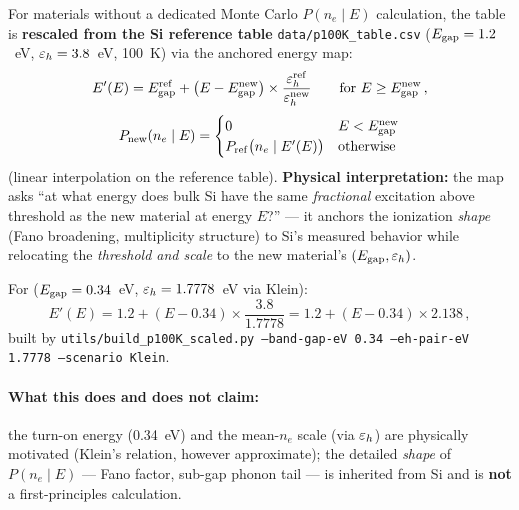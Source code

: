 For materials without a dedicated Monte Carlo $P(n_e\mid E)$ calculation,
the table is \textbf{rescaled from the Si reference table}
\texttt{data/p100K\_table.csv} ($E_\mathrm{gap}=1.2$~eV, $\varepsilon_h=3.8$~eV, 100~K) via
the anchored energy map:
\begin{equation}
E'(E) = E_\mathrm{gap}^\mathrm{ref} + \bigl(E - E_\mathrm{gap}^\mathrm{new}\bigr)\times
\frac{\varepsilon_h^\mathrm{ref}}{\varepsilon_h^\mathrm{new}} \qquad \text{for } E \geq E_\mathrm{gap}^\mathrm{new}\,,
\end{equation}
\begin{equation}
P_\mathrm{new}(n_e\mid E) = \begin{cases}
0 & E < E_\mathrm{gap}^\mathrm{new} \\
P_\mathrm{ref}\bigl(n_e \mid E'(E)\bigr) & \text{otherwise}
\end{cases}
\end{equation}
(linear interpolation on the reference table). \textbf{Physical
interpretation:} the map asks ``at what energy does bulk Si have the same
\emph{fractional} excitation above threshold as the new material at energy
$E$?'' — it anchors the ionization \emph{shape} (Fano broadening,
multiplicity structure) to Si's measured behavior while relocating the
\emph{threshold and scale} to the new material's $(E_\mathrm{gap},\varepsilon_h)$.

For \SrCdSb{} ($E_\mathrm{gap}=0.34$~eV, $\varepsilon_h=1.7778$~eV via Klein):
\begin{equation}
E'(E) = 1.2 + (E-0.34)\times\frac{3.8}{1.7778} = 1.2 + (E-0.34)\times2.138\,,
\end{equation}
built by \texttt{utils/build\_p100K\_scaled.py --band-gap-eV 0.34
--eh-pair-eV 1.7778 --scenario Klein}.

\paragraph{What this does and does not claim:} the turn-on energy
(0.34~eV) and the mean-$n_e$ scale (via $\varepsilon_h$) are physically motivated
(Klein's relation, however approximate); the detailed \emph{shape} of
$P(n_e\mid E)$ — Fano factor, sub-gap phonon tail — is inherited from Si
and is \textbf{not} a first-principles \SrCdSb{} calculation.
